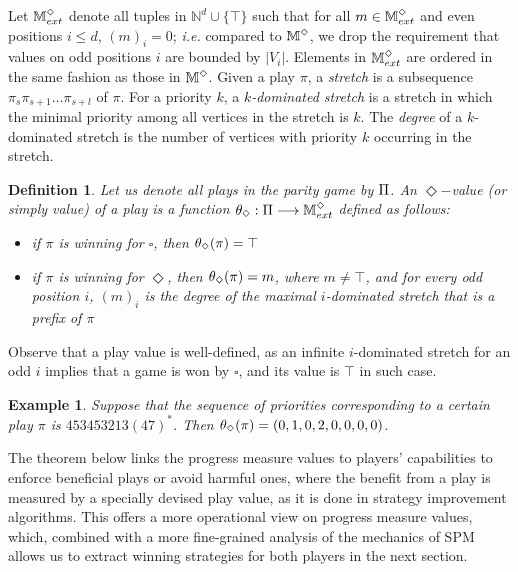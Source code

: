 \documentclass{eptcs}
\newtheorem{defi}{Definition}
\newtheorem{exam}{Example}
\newenvironment{definition}{\begin{defi} \rm }{\end{defi}}
\newenvironment{example}{\begin{exam} \rm }{\end{exam}}
\def\nat{\mathbb{N}}
\newcommand{\odd}{\ensuremath{\square}\xspace}
\newcommand{\even}{\ensuremath{\Diamond}\xspace}
\newcommand{\ie}{\emph{i.e.}\xspace}
\begin{document}
Let $\exteventups$ denote all tuples in $\nat^{d} \cup \{\top\}$
such that for all $m \in \exteventups$ and even positions $i \leq
d$, $(m)_i =0$; \ie compared to $\eventups$, we drop the requirement that
values on odd positions $i$ are bounded by $|V_i|$. Elements in $\exteventups$ are ordered in the same fashion as those in $\eventups$. Given a 
play $\pi$, a \emph{stretch} is a subsequence
$\pi_s \pi_{s+1} \dots \pi_{s+l}$ of $\pi$. For a priority $k$, a
\emph{$k$-dominated stretch} is a stretch in which the minimal
priority among all vertices in the stretch is $k$. The \emph{degree}
of a $k$-dominated stretch is the number of vertices with priority
$k$ occurring in the stretch.
\begin{definition}
Let us denote all plays in the parity game by $\Pi$. An $\even-$\emph{value} (or simply value) of a play is a function $\profilefun{\even}: \allplays \longrightarrow \exteventups$ defined as follows:
\begin{itemize}
 \item if $\pi$ is winning for $\odd$, then $\profile{\even}{\pi} = \top$
 \item if $\pi$ is winning for $\even$, then $\profile{\even}{\pi} = m$, where 
 $m \neq \top$, and for every odd position $i$, $(m)_i$ is the \emph{degree} of the maximal $i$-dominated stretch that is a prefix of $\pi$ 
\end{itemize}
\end{definition}
Observe that a play value is well-defined, as an
infinite $i$-dominated stretch for an odd $i$ implies that a game
is won by $\odd$, and its value is $\top$ in such case. 

\begin{example}
Suppose that the sequence of priorities corresponding to a certain
play $\pi$ is $453453213(47)^{*}$. Then $\profile{\even}{\pi} =
(0,1,0,2,0,0,0,0)$.

\end{example}
 
 
 
The theorem below links the progress measure values to players' capabilities to enforce beneficial plays or avoid harmful ones, where the benefit from a play is measured by a specially devised play value, as it is done in strategy improvement algorithms. 
This offers a more operational view on progress measure values, which, combined with a more fine-grained analysis of the mechanics of SPM allows us to extract winning strategies for both players in the next section.
 
\end{document}
